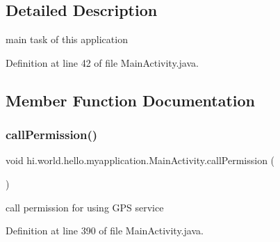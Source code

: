 \subsection{Detailed Description}
main task of this application 

Definition at line 42 of file Main\+Activity.\+java.



\subsection{Member Function Documentation}
\mbox{\label{classhi_1_1world_1_1hello_1_1myapplication_1_1_main_activity_ae61743a762c89114c69122afb6743aef}} 
\subsubsection{\texorpdfstring{callPermission()}{callPermission()}}
{\footnotesize\ttfamily void hi.\+world.\+hello.\+myapplication.\+Main\+Activity.\+call\+Permission (\begin{DoxyParamCaption}{ }\end{DoxyParamCaption})\hspace{0.3cm}{\ttfamily [private]}}



call permission for using G\+PS service 



Definition at line 390 of file Main\+Activity.\+java.


